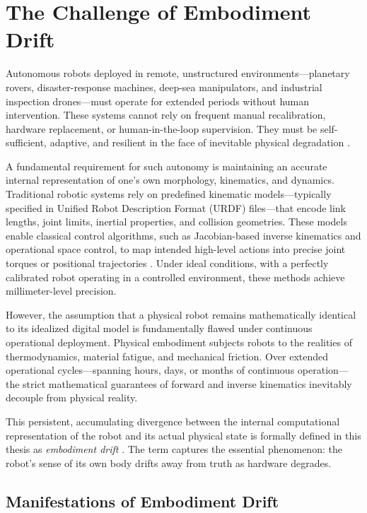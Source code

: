\documentclass[12pt,a4paper,oneside]{report}
\begin{document}
\section{The Challenge of Embodiment Drift}
\label{sec:challenge_embodiment_drift}

Autonomous robots deployed in remote, unstructured environments---planetary rovers, disaster-response machines, deep-sea manipulators, and industrial inspection drones---must operate for extended periods without human intervention. These systems cannot rely on frequent manual recalibration, hardware replacement, or human-in-the-loop supervision. They must be self-sufficient, adaptive, and resilient in the face of inevitable physical degradation \cite{bongard2006resilient, cully2015robots}.

A fundamental requirement for such autonomy is maintaining an accurate internal representation of one's own morphology, kinematics, and dynamics. Traditional robotic systems rely on predefined kinematic models---typically specified in Unified Robot Description Format (URDF) files---that encode link lengths, joint limits, inertial properties, and collision geometries. These models enable classical control algorithms, such as Jacobian-based inverse kinematics and operational space control, to map intended high-level actions into precise joint torques or positional trajectories \cite{siciliano2009robotics}. Under ideal conditions, with a perfectly calibrated robot operating in a controlled environment, these methods achieve millimeter-level precision.

However, the assumption that a physical robot remains mathematically identical to its idealized digital model is fundamentally flawed under continuous operational deployment. Physical embodiment subjects robots to the realities of thermodynamics, material fatigue, and mechanical friction. Over extended operational cycles---spanning hours, days, or months of continuous operation---the strict mathematical guarantees of forward and inverse kinematics inevitably decouple from physical reality.

This persistent, accumulating divergence between the internal computational representation of the robot and its actual physical state is formally defined in this thesis as \textit{embodiment drift} \cite{bongard2006resilient, kwiatkowski2019task}. The term captures the essential phenomenon: the robot's sense of its own body drifts away from truth as hardware degrades.

\subsection{Manifestations of Embodiment Drift}
\label{subsec:manifestations_embodiment_drift}
\end{document}
